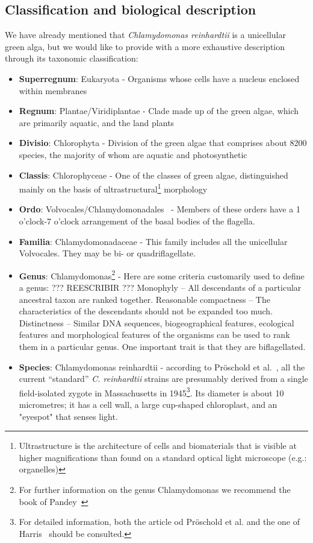 \subsection{Classification and biological description}

We have already mentioned that \textit{Chlamydomonas reinhardtii}
is a unicellular green alga, but we would like to provide with a more exhaustive description through its taxonomic classification: 

\begin{itemize}
	\item \textbf{Superregnum}: Eukaryota - Organisms whose cells have a nucleus enclosed within membranes	
	\item \textbf{Regnum}: Plantae/Viridiplantae - Clade made up of the green algae, which are primarily aquatic, and the land plants
	\item \textbf{Divisio}: Chlorophyta - Division of the green algae that comprises about 8200 species, the majority of whom are aquatic and photosynthetic
	\item \textbf{Classis}: Chlorophyceae - One of the classes of green algae, distinguished mainly on the basis of ultrastructural\footnote{Ultrastructure is the architecture of cells and biomaterials that is visible at higher magnifications than found on a standard optical light microscope (e.g.: organelles)} morphology
	\item \textbf{Ordo}: Volvocales/Chlamydomonadales~\cite{chlorophyceae} - Members of these orders have a 1 o'clock-7 o'clock arrangement of the basal bodies of the flagella.
	\item \textbf{Familia}: Chlamydomonadaceae - This family includes all the unicellular Volvocales. They may be bi- or quadriflagellate.
	\item \textbf{Genus}: Chlamydomonas\footnote{For further information on the genus Chlamydomonas we recommend the book of Pandey~\cite{Pandey}} - Here are some criteria customarily used to define a genus:
	??? REESCRIBIR ???
		\subitem Monophyly – All descendants of a particular ancestral taxon are ranked together.
		\subitem Reasonable compactness – The characteristics of the descendants should not be expanded too much.
		\subitem Distinctness – Similar DNA sequences, biogeographical features, ecological features and morphological features of the organisms can be used to rank them in a particular genus. One important trait is that they are biflagellated.
	\item \textbf{Species}: Chlamydomonas reinhardtii - according to Pröschold et al.~\cite{Proschold}, all the current “standard” \textit{C. reinhardtii} strains are presumably derived from a single field-isolated zygote in Massachusetts in 1945\footnote{For detailed information, both the article od Pröschold et al. and the one of Harris~\cite{Harris} should be consulted.}. Its diameter is about 10 micrometres; it has a cell wall, a large cup-shaped chloroplast, and an "eyespot" that senses light. 
\end{itemize}


